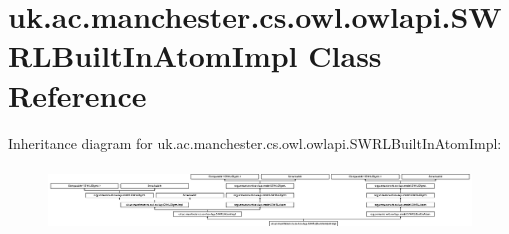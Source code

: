 \hypertarget{classuk_1_1ac_1_1manchester_1_1cs_1_1owl_1_1owlapi_1_1_s_w_r_l_built_in_atom_impl}{\section{uk.\-ac.\-manchester.\-cs.\-owl.\-owlapi.\-S\-W\-R\-L\-Built\-In\-Atom\-Impl Class Reference}
\label{classuk_1_1ac_1_1manchester_1_1cs_1_1owl_1_1owlapi_1_1_s_w_r_l_built_in_atom_impl}
}
Inheritance diagram for uk.\-ac.\-manchester.\-cs.\-owl.\-owlapi.\-S\-W\-R\-L\-Built\-In\-Atom\-Impl\-:\begin{figure}[H]
\begin{center}
\leavevmode
\includegraphics[height=1.739130cm]{classuk_1_1ac_1_1manchester_1_1cs_1_1owl_1_1owlapi_1_1_s_w_r_l_built_in_atom_impl}
\end{center}
\end{figure}
